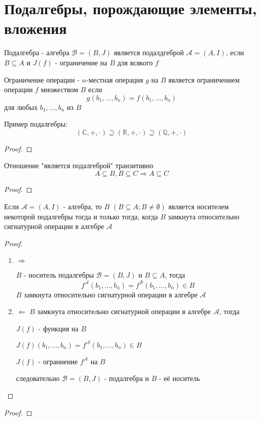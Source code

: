 \documentclass[../main/document.tex]{subfiles}
\begin{document}
\section{Подалгебры, порождающие элементы,\\ вложения}

\begin{dfn}[Подалгебра]
Подалгебра - алгебра $\mathcal{B}=(B,J)$ является подалдгеброй $\mathcal{A}=(A,I)$, если $B\subseteq A$ и $J(f)$ - ограничение на $B$ для всякого $f$
\end{dfn}
\begin{dfn}
Ограничение операции - $n$-местная операция $g$ на $B$ является ограничением операции $f$ множеством $B$ если 
$$g(b_1,...,b_n)=f(b_1,...,b_n)$$
для любых $b_1,...,b_n$ из $B$
\end{dfn}
\begin{exm}

\end{exm}
\begin{exm}
Пример подалгебры:
$$(\mathbb{C},+,\cdot)\supseteq (\mathbb{R},+,\cdot)\supseteq (\mathbb{Q},+,\cdot)$$
\begin{proof}

\end{proof}
\end{exm}
\begin{cnsq}
Отношение "является подалгеброй" транзитивно
$$A\subseteq B, B\subseteq C \Rightarrow A\subseteq C$$
\begin{proof}

\end{proof}
\end{cnsq}
\begin{thm}\label{carrier-theorem}
Если $\mathcal{A}=(A,I)$ - алгебра, то $B$ $(B\subseteq A; B\neq \emptyset)$ является носителем некоторой подалгебры тогда и только тогда, когда $B$ замкнута относительно сигнатурной операции в алгебре $\mathcal{A}$
\begin{proof}
\begin{enumerate}
\item $\Rightarrow$

$B$ - носитель подалгебры $\mathcal{B}=(B,J)$ и $B\subseteq A$, тогда
$$f^{\mathcal{A}}(b_1,...,b_n)=f^{\mathcal{B}}(b_1,...,b_n)\in B$$
$B$ замкнута относительно сигнатурной операции в алгебре $\mathcal{A}$
\item $\Leftarrow$
$B$ замкнута относительно сигнатурной операции в алгебре $\mathcal{A}$, тогда

$J(f)$ - функция на $B$

$J(f)(b_1,...,b_n)=f^{\mathcal{A}}(b_1,...,b_n)\in B$

$J(f)$ - ограниение $f^{\mathcal{A}}$  на $B$

следовательно $\mathcal{B}=(B,J)$ - подалгебра и $B$ - её носитель
\end{enumerate}
\end{proof}
\end{thm}
\begin{exm}

\end{exm}

\begin{thm}
\begin{proof}

\end{proof}
\end{thm}
\end{document}
